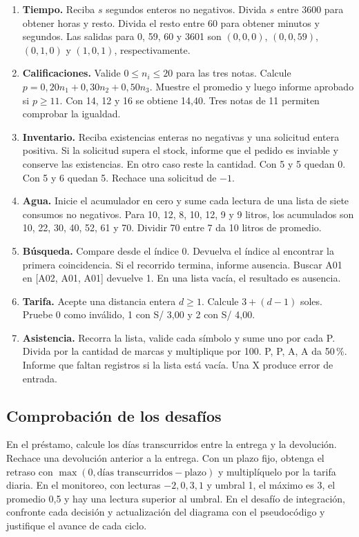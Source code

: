 \begin{enumerate}
\item \textbf{Tiempo.} Reciba \(s\) segundos enteros no negativos. Divida \(s\) entre 3600 para obtener horas y resto. Divida el resto entre 60 para obtener minutos y segundos. Las salidas para 0, 59, 60 y 3601 son \((0,0,0)\), \((0,0,59)\), \((0,1,0)\) y \((1,0,1)\), respectivamente.
\item \textbf{Calificaciones.} Valide \(0\leq n_i\leq 20\) para las tres notas. Calcule \(p=0{,}20n_1+0{,}30n_2+0{,}50n_3\). Muestre el promedio y luego informe aprobado si \(p\geq 11\). Con 14, 12 y 16 se obtiene 14,40. Tres notas de 11 permiten comprobar la igualdad.
\item \textbf{Inventario.} Reciba existencias enteras no negativas y una solicitud entera positiva. Si la solicitud supera el stock, informe que el pedido es inviable y conserve las existencias. En otro caso reste la cantidad. Con 5 y 5 quedan 0. Con 5 y 6 quedan 5. Rechace una solicitud de \(-1\).
\item \textbf{Agua.} Inicie el acumulador en cero y sume cada lectura de una lista de siete consumos no negativos. Para 10, 12, 8, 10, 12, 9 y 9 litros, los acumulados son 10, 22, 30, 40, 52, 61 y 70. Dividir 70 entre 7 da 10 litros de promedio.
\item \textbf{Búsqueda.} Compare desde el índice 0. Devuelva el índice al encontrar la primera coincidencia. Si el recorrido termina, informe ausencia. Buscar A01 en [A02, A01, A01] devuelve 1. En una lista vacía, el resultado es ausencia.
\item \textbf{Tarifa.} Acepte una distancia entera \(d\geq 1\). Calcule \(3+(d-1)\) soles. Pruebe 0 como inválido, 1 con S/ 3,00 y 2 con S/ 4,00.
\item \textbf{Asistencia.} Recorra la lista, valide cada símbolo y sume uno por cada P. Divida por la cantidad de marcas y multiplique por 100. P, P, A, A da 50\,\%. Informe que faltan registros si la lista está vacía. Una X produce error de entrada.
\end{enumerate}

\subsection{Comprobación de los desafíos}

En el préstamo, calcule los días transcurridos entre la entrega y la devolución. Rechace una devolución anterior a la entrega. Con un plazo fijo, obtenga el retraso con \(\max(0,\text{días transcurridos}-\text{plazo})\) y multiplíquelo por la tarifa diaria. En el monitoreo, con lecturas \(-2,0,3,1\) y umbral 1, el máximo es 3, el promedio 0,5 y hay una lectura superior al umbral. En el desafío de integración, confronte cada decisión y actualización del diagrama con el pseudocódigo y justifique el avance de cada ciclo.

